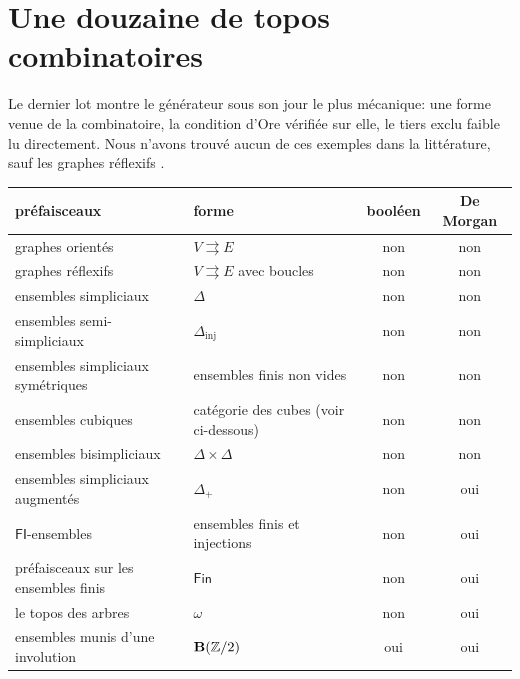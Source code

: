 \section{Une douzaine de topos combinatoires}\label{sec:shapes}

Le dernier lot montre le générateur sous son jour le plus mécanique: une forme venue de la combinatoire, la condition d'Ore vérifiée sur elle, le tiers exclu faible lu directement. Nous n'avons trouvé aucun de ces exemples dans la littérature, sauf les graphes réflexifs \cite[Ex.~2.52]{hemelaer-rogers}.

\begin{theorem}\label{th:shapes}
\begin{center}\small
\begin{tabular}{llcc}
\toprule
préfaisceaux & forme & booléen & De Morgan\\
\midrule
graphes orientés & $V\rightrightarrows E$ & non & non\\
graphes réflexifs & $V\rightrightarrows E$ avec boucles & non & non\\
ensembles simpliciaux & $\Delta$ & non & non\\
ensembles semi-simpliciaux & $\Delta_{\mathrm{inj}}$ & non & non\\
ensembles simpliciaux symétriques & ensembles finis non vides & non & non\\
ensembles cubiques & catégorie des cubes (voir ci-dessous) & non & non\\
ensembles bisimpliciaux & $\Delta\times\Delta$ & non & non\\
ensembles simpliciaux augmentés & $\Delta_+$ & non & oui\\
$\mathsf{FI}$-ensembles & ensembles finis et injections & non & oui\\
préfaisceaux sur les ensembles finis & $\mathsf{Fin}$ & non & oui\\
le topos des arbres & $\omega$ & non & oui\\
ensembles munis d'une involution & $\mathbf{B}(\mathbb Z/2)$ & oui & oui\\
\bottomrule
\end{tabular}
\end{center}
\end{theorem}

